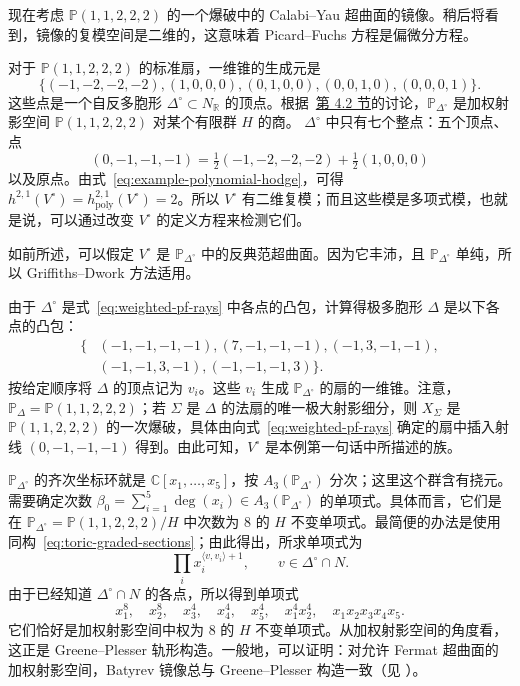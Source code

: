 \begin{example}\label{ex:weighted-pf-method}
现在考虑 $\mathbb P(1,1,2,2,2)$ 的一个爆破中的 Calabi--Yau 超曲面的镜像。稍后将看到，镜像的复模空间是二维的，这意味着 Picard--Fuchs 方程是偏微分方程。

对于 $\mathbb P(1,1,2,2,2)$ 的标准扇，一维锥的生成元是
\begin{equation}\label{eq:weighted-pf-rays}
\{(-1,-2,-2,-2),(1,0,0,0),(0,1,0,0),(0,0,1,0),(0,0,0,1)\}.
\end{equation}
这些点是一个自反多胞形 $\Delta^\circ\subset N_{\mathbb R}$ 的顶点。根据~\hyperref[sec:quintic-revisited]{第 4.2 节}的讨论，$\mathbb P_{\Delta^\circ}$ 是加权射影空间 $\mathbb P(1,1,2,2,2)$ 对某个有限群 $H$ 的商。
$\Delta^\circ$ 中只有七个整点：五个顶点、点
\[
(0,-1,-1,-1)=\tfrac12(-1,-2,-2,-2)+\tfrac12(1,0,0,0)
\]
以及原点。由式~\eqref{eq:example-polynomial-hodge}，可得
$h^{2,1}(V^\circ)=h_{\mathrm{poly}}^{2,1}(V^\circ)=2$。所以 $V^\circ$ 有二维复模；而且这些模是多项式模，也就是说，可以通过改变 $V^\circ$ 的定义方程来检测它们。

如前所述，可以假定 $V^\circ$ 是 $\mathbb P_{\Delta^\circ}$ 中的反典范超曲面。因为它丰沛，且 $\mathbb P_{\Delta^\circ}$ 单纯，所以 Griffiths--Dwork 方法适用。

由于 $\Delta^\circ$ 是式~\eqref{eq:weighted-pf-rays} 中各点的凸包，计算得极多胞形 $\Delta$ 是以下各点的凸包：
\begin{equation}\label{eq:weighted-pf-polar}
\begin{split}
\{&(-1,-1,-1,-1),(7,-1,-1,-1),(-1,3,-1,-1),\\
&(-1,-1,3,-1),(-1,-1,-1,3)\}.
\end{split}
\end{equation}
按给定顺序将 $\Delta$ 的顶点记为 $v_i$。这些 $v_i$ 生成 $\mathbb P_{\Delta^\circ}$ 的扇的一维锥。注意，$\mathbb P_\Delta=\mathbb P(1,1,2,2,2)$；若 $\Sigma$ 是 $\Delta$ 的法扇的唯一极大射影细分，则 $X_\Sigma$ 是 $\mathbb P(1,1,2,2,2)$ 的一次爆破，具体由向式~\eqref{eq:weighted-pf-rays} 确定的扇中插入射线 $(0,-1,-1,-1)$ 得到。由此可知，$V^\circ$ 是本例第一句话中所描述的族。

$\mathbb P_{\Delta^\circ}$ 的齐次坐标环就是 $\mathbb C[x_1,\ldots,x_5]$，按 $A_3(\mathbb P_{\Delta^\circ})$ 分次；这里这个群含有挠元。需要确定次数
$\beta_0=\sum_{i=1}^5\deg(x_i)\in A_3(\mathbb P_{\Delta^\circ})$ 的单项式。具体而言，它们是在
$\mathbb P_{\Delta^\circ}=\mathbb P(1,1,2,2,2)/H$ 中次数为 $8$ 的 $H$ 不变单项式。最简便的办法是使用同构~\eqref{eq:toric-graded-sections}；由此得出，所求单项式为
\[
\prod_i x_i^{\langle v,v_i\rangle+1},\qquad v\in\Delta^\circ\cap N.
\]
由于已经知道 $\Delta^\circ\cap N$ 的各点，所以得到单项式
\[
x_1^8,\quad x_2^8,\quad x_3^4,\quad x_4^4,\quad x_5^4,
\quad x_1^4x_2^4,\quad x_1x_2x_3x_4x_5.
\]
它们恰好是加权射影空间中权为 $8$ 的 $H$ 不变单项式。从加权射影空间的角度看，这正是 Greene--Plesser 轨形构造。一般地，可以证明：对允许 Fermat 超曲面的加权射影空间，Batyrev 镜像总与 Greene--Plesser 构造一致（见 ）。


\end{example}
